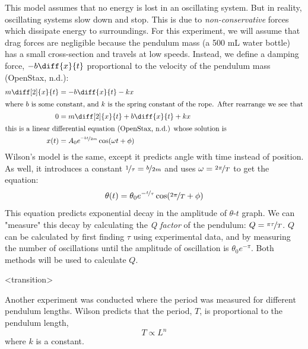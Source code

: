 \documentclass[notitlepage,twocolumn, 12pt]{report}
\begin{document}
    This model assumes that no energy is lost in an oscillating system. But in reality, oscillating systems slow down and stop. This is due to \textit{non-conservative} forces which dissipate energy to surroundings. For this experiment, we will assume that drag forces are negligible because the pendulum mass (a 500 mL water bottle) has a small cross-section and travels at low speeds. Instead, we define a damping force, $-b \diff{x}{t}$ proportional to the velocity of the pendulum mass (OpenStax, n.d.):
    \begin{align*}
        m \diff[2]{x}{t} &= - b \diff{x}{t} - kx \\
        \intertext{where $b$ is some constant, and $k$ is the spring constant of the rope. After rearrange we see that}
        0 &= m \diff[2]{x}{t} + b \diff{x}{t} + kx   \\
    \intertext{this is a linear differential equation (OpenStax, n.d.) whose solution is} 
        x(t) &= A_0e^{\nicefrac{-bt}{2m}}\cos(\omega t + \phi)
    \end{align*} 
    Wilson's model is the same, except it predicts angle with time instead of position. As well, it introduces a constant $\nicefrac{1}{\tau} = \nicefrac{b}{2m}$ and uses $\omega = \nicefrac{2 \pi}{T}$ to get the equation:
    \begin{equation}\label{eq:1}
        \theta(t) = \theta_0 e^{-\nicefrac{t}{\tau}}\cos(\nicefrac{2\pi}{T} + \phi)
    \end{equation}
    This equation predicts exponential decay in the amplitude of $\theta$-$t$ graph. We can "measure" this decay by calculating the \textit{Q factor} of the pendulum: $Q = \nicefrac{\pi \tau}{T}$. $Q$ can be calculated by first finding $\tau$ using experimental data, and by measuring the number of oscillations until the amplitude of oscillation is $\theta_0e^{-\pi}$. Both methods will be used to calculate $Q$. 

    <transition>

    Another experiment was conducted where the period was measured for different pendulum lengths. Wilson predicts that the period, $T$, is proportional to the pendulum length, $$T \propto L^n$$
    where $k$ is a constant.
    
\end{document}

